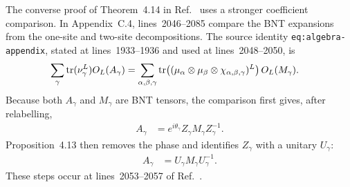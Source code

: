 \documentclass{article}
\begin{document}
The converse proof of Theorem~4.14 in
Ref.~\cite{Cirac2016MPDO_arXiv} uses a stronger coefficient comparison. In
Appendix~C.4, lines~2046--2085 compare the BNT expansions from the one-site
and two-site decompositions. The source identity
\texttt{eq:algebra-appendix}, stated at lines~1933--1936 and used at
lines~2048--2050, is
\begin{align}
    \sum_\gamma \operatorname{tr}(\nu_\gamma^L)O_L(A_\gamma)
        &=
        \sum_{\alpha,\beta,\gamma}
        \operatorname{tr}\!\left((\mu_\alpha\otimes\mu_\beta
            \otimes\chi_{\alpha,\beta,\gamma})^L\right)O_L(M_\gamma).
\label{eq:cpgsv17_blocked_chi_uniformity_source_bnt_comparison}
\end{align}
Because both $A_\gamma$ and $M_\gamma$ are BNT tensors, the comparison first
gives, after relabelling,
\begin{align}
    A_\gamma
        &= e^{i\theta_\gamma}
            Z_\gamma M_\gamma Z_\gamma^{-1}.
\label{eq:cpgsv17_blocked_chi_uniformity_phase_gauge_relation}
\end{align}
Proposition~4.13 then removes the phase and identifies $Z_\gamma$ with a
unitary $U_\gamma$:
\begin{align}
    A_\gamma
        &= U_\gamma M_\gamma U_\gamma^{-1}.
\label{eq:cpgsv17_blocked_chi_uniformity_unitary_gauge_relation}
\end{align}
These steps occur at lines~2053--2057 of
Ref.~\cite{Cirac2016MPDO_arXiv}.
\end{document}
